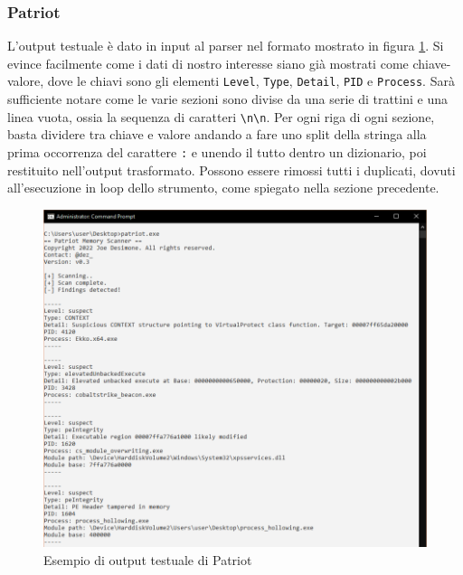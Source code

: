 \subsubsection{Patriot}
L'output testuale è dato in input al parser nel formato mostrato in figura \ref{fig:dynamic-patriot-output-text}.
Si evince facilmente come i dati di nostro interesse siano già mostrati come chiave-valore, dove le chiavi sono gli elementi \texttt{Level}, \texttt{Type}, \texttt{Detail}, \texttt{PID} e \texttt{Process}.
Sarà sufficiente notare come le varie sezioni sono divise da una serie di trattini e una linea vuota, ossia la sequenza di caratteri \texttt{\textbackslash{}n\textbackslash{}n}. Per ogni riga di ogni sezione, basta dividere tra chiave e valore andando a fare uno split della stringa alla prima occorrenza del carattere \texttt{:} e unendo il tutto dentro un dizionario, poi restituito nell'output trasformato.
Possono essere rimossi tutti i duplicati, dovuti all'esecuzione in loop dello strumento, come spiegato nella sezione precedente.

\begin{figure}[htbp]
    \centering
    \includegraphics[width=\textwidth]{assets/patriot-example-output.png}
    \caption{Esempio di output testuale di Patriot}
    \label{fig:dynamic-patriot-output-text}
\end{figure}

